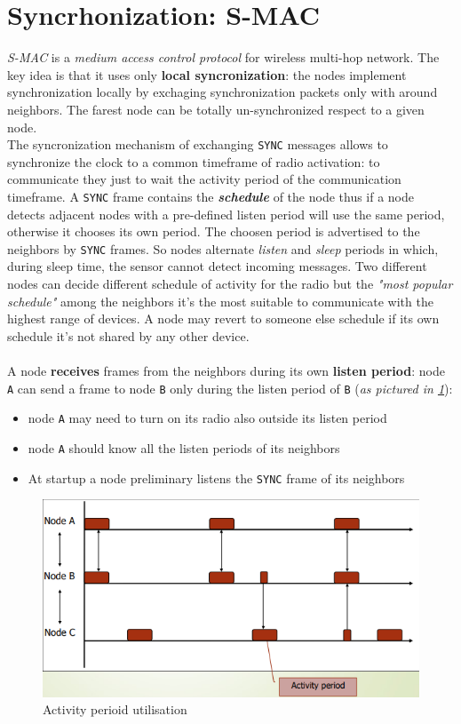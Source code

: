 \documentclass[10pt,a4paper]{report}
\theoremstyle{definition}
\begin{document}
\section{Syncrhonization: S-MAC}\label{sec:syncrhonization-s-mac}
\textit{S-MAC} is a \textit{medium access control protocol} for wireless multi-hop network.
The key idea is that it uses only \textbf{local syncronization}: the nodes implement synchronization locally by exchaging synchronization packets only with around neighbors. The farest node can be totally un-synchronized respect to a given node.\\
The syncronization mechanism of exchanging \texttt{SYNC} messages allows to synchronize the clock to a common timeframe of radio activation: to communicate they just to wait the activity period of the communication timeframe. A \texttt{SYNC} frame contains the \textit{\textbf{schedule}} of the node thus if a node detects adjacent nodes with a pre-defined listen period will use the same period, otherwise it chooses its own period. The choosen period is advertised to the neighbors by \texttt{SYNC} frames.
So nodes alternate \textit{listen} and \textit{sleep} periods in which, during sleep time, the sensor cannot detect incoming messages.
Two different nodes can decide different schedule of activity for the radio but the \textit{"most popular schedule"} among the neighbors it's the most suitable to communicate with the highest range of devices.
A node may revert to someone else schedule if its own schedule it's not shared by any other device.\\\\
A node \textbf{receives} frames from the neighbors during its own \textbf{listen period}: node \texttt{A} can send a frame to node \texttt{B} only during the listen period of \texttt{B} (\textit{as pictured in \ref{s-mac1}}):
\begin{itemize}
	\item 
	node \texttt{A} may need to turn on its radio also outside its listen period
	\item 
	node \texttt{A} should know all the listen periods of its neighbors
	\item 
	At startup a node preliminary listens the \texttt{SYNC} frame of its neighbors

\end{itemize}

\begin{figure}[h]
	\centering\includegraphics[scale=0.50]{images/Pasted image 20230404171403.png}
	\caption{Activity perioid utilisation}
\label{s-mac1}
\end{figure}
\end{document}
